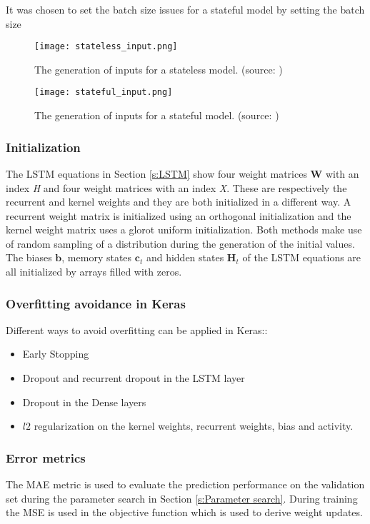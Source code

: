 It was chosen to set the batch size issues for a stateful model by setting the batch size 

\begin{figure}[h]
	\centering
	\texttt{[image: stateless\_input.png]}
	\caption{The generation of inputs for a stateless model. (source: \cite{FneishMo})}
	\label{fig:stateless_input}
\end{figure}

\begin{figure}[h]
	\centering
	\texttt{[image: stateful\_input.png]}
	\caption{The generation of inputs for a stateful model. (source: \cite{FneishMo})}
	\label{fig:stateful_input}
\end{figure}

\subsubsection{Initialization}
The LSTM equations in Section \ref{s:LSTM} show four weight matrices $ \bm{W} $ with an index \textit{H} and four weight matrices with an index \textit{X}. These are respectively the recurrent and kernel weights and they are both initialized in a different way. A recurrent weight matrix is initialized using an orthogonal initialization and the kernel weight matrix uses a glorot uniform initialization. Both methods make use of random sampling of a distribution  during the generation of the initial values. The biases $ \bm{b} $, memory states $ \bm{c}_t $ and hidden states $ \bm{H}_t $ of the LSTM equations are all initialized by arrays filled with zeros.\\

\subsubsection{Overfitting avoidance in Keras}
Different ways to avoid overfitting can be applied in Keras::
\begin{itemize}
	\item Early Stopping
	\item Dropout and recurrent dropout in the LSTM layer
	\item Dropout in the Dense layers
	\item $ l2 $ regularization on the kernel weights, recurrent weights, bias and activity.
\end{itemize}


\subsubsection{Error metrics}
The  MAE metric is used to evaluate the prediction performance on the validation set during the parameter search in Section \ref{s:Parameter search}. During training the MSE is used in the objective function which is used to derive weight updates.


